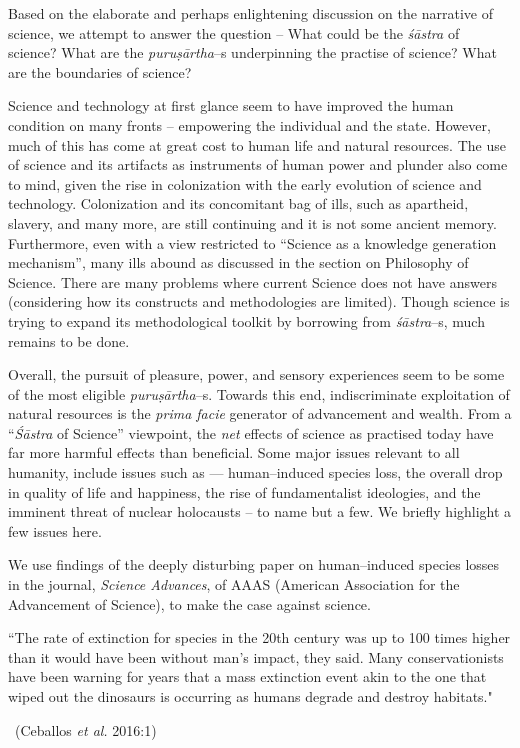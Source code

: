 Based on the elaborate and perhaps enlightening discussion on the narrative of science, we attempt to answer the question – What could be the \textit{śāstra} of science? What are the \textit{puruṣārtha}–s underpinning the practise of science? What are the boundaries of science?

Science and technology at first glance seem to have improved the human condition on many fronts – empowering the individual and the state. However, much of this has come at great cost to human life and natural resources. The use of science and its artifacts as instruments of human power and plunder also come to mind, given the rise in colonization with the early evolution of science and technology. Colonization and its concomitant bag of ills, such as apartheid, slavery, and many more, are still continuing and it is not some ancient memory. Furthermore, even with a view restricted to “Science as a knowledge generation mechanism”, many ills abound as discussed in the section on Philosophy of Science. There are many problems where current Science does not have answers (considering how its constructs and methodologies are limited). Though science is trying to expand its methodological toolkit by borrowing from \textit{śāstra}–s, much remains to be done.

Overall, the pursuit of pleasure, power, and sensory experiences seem to be some of the most eligible \textit{puruṣārtha}–s. Towards this end, indiscriminate exploitation of natural resources is the \textit{prima facie} generator of advancement and wealth. From a “\textit{Śāstra} of Science” viewpoint, the \textit{net} effects of science as practised today have far more harmful effects than beneficial. Some major issues relevant to all humanity, include issues such as — human–induced species loss, the overall drop in quality of life and happiness, the rise of fundamentalist ideologies, and the imminent threat of nuclear holocausts – to name but a few. We briefly highlight a few issues here.

We use findings of the deeply disturbing paper on human–induced species losses in the journal, \textit{Science Advances}, of AAAS (American Association for the Advancement of Science), to make the case against science.

\begin{myquote}
“The rate of extinction for species in the 20th century was up to 100 times higher than it would have been without man’s impact, they said. Many conservationists have been warning for years that a mass extinction event akin to the one that wiped out the dinosaurs is occurring as humans degrade and destroy habitats." 

~\hfill (Ceballos \textit{et al.} 2016:1)
\end{myquote}

